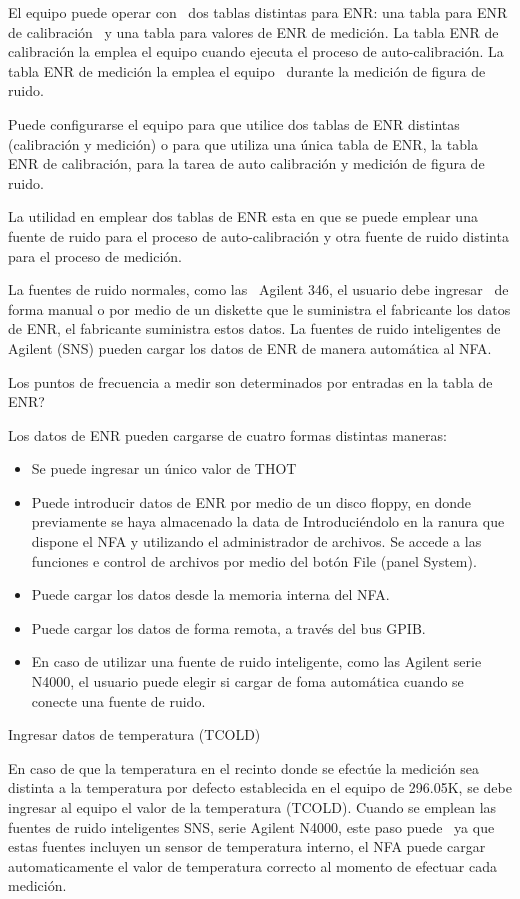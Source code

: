 \documentclass[paper=letter,oneside,fontsize=10pt,parskip=full]{article}
\begin{document}
El equipo puede operar con \ dos tablas distintas para ENR: una tabla para ENR de calibración \ y una tabla para valores
de ENR de medición. La tabla ENR de calibración la emplea el equipo cuando ejecuta el proceso de auto-calibración. La
tabla ENR de medición la emplea el equipo \ durante la medición de figura de ruido. \ 

Puede configurarse el equipo para que utilice dos tablas de ENR distintas (calibración y medición) o para que utiliza
una única tabla de ENR, la tabla ENR de calibración, para la tarea de auto calibración y medición de figura de ruido.

La utilidad en emplear dos tablas de ENR esta en que se puede emplear una fuente de ruido para el proceso de
auto-calibración y otra fuente de ruido distinta para el proceso de medición. 

La fuentes de ruido normales, como las \ Agilent 346, el usuario debe ingresar \ de forma manual o por medio de un
diskette que le suministra el fabricante los datos de ENR, el fabricante suministra estos datos. La fuentes de ruido
inteligentes de Agilent (SNS) pueden cargar los datos de ENR de manera automática al NFA.

Los puntos de frecuencia a medir son determinados por entradas en la tabla de ENR?

Los datos de ENR pueden cargarse de cuatro formas distintas maneras:

\begin{itemize}
\item Se puede ingresar un único valor de THOT
\item Puede introducir datos de ENR por medio de un disco floppy, en donde previamente se haya almacenado la data de
Introduciéndolo en la ranura que dispone el NFA y utilizando el administrador de archivos. Se accede a las funciones e
control de archivos por medio del botón File (panel System).
\item Puede cargar los datos desde la memoria interna del NFA. 
\item Puede cargar los datos de forma remota, a través del bus GPIB. 
\item En caso de utilizar una fuente de ruido inteligente, como las Agilent serie N4000, el usuario puede elegir si
cargar de foma automática cuando se conecte una fuente de ruido.
\end{itemize}
Ingresar datos de temperatura (TCOLD)

En caso de que la temperatura en el recinto donde se efectúe la medición sea distinta a la temperatura por defecto
establecida en el equipo de 296.05K, se debe ingresar al equipo el valor de la temperatura (TCOLD). Cuando se emplean
las fuentes de ruido inteligentes SNS, serie Agilent N4000, este paso puede \ ya que estas fuentes incluyen un sensor
de temperatura interno, el NFA puede cargar automaticamente el valor de temperatura correcto al momento de efectuar
cada medición.
\end{document}
